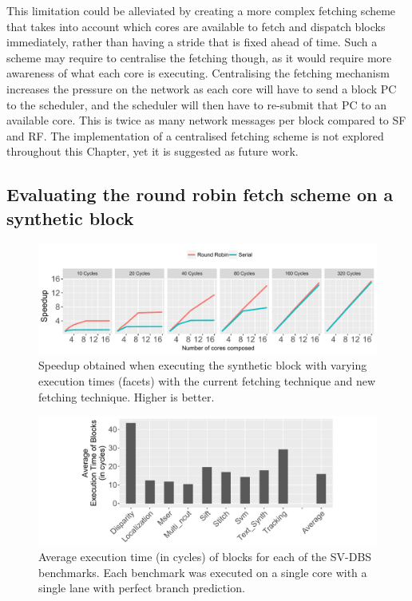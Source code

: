 This limitation could be alleviated by creating a more complex fetching scheme that takes into account which cores are available to fetch and dispatch blocks immediately, rather than having a stride that is fixed ahead of time.
Such a scheme may require to centralise the fetching though, as it would require more awareness of what each core is executing.
Centralising the fetching mechanism increases the pressure on the network as each core will have to send a block PC to the scheduler, and the scheduler will then have to re-submit that PC to an available core.
This is twice as many network messages per block compared to SF and RF.
The implementation of a centralised fetching scheme is not explored throughout this Chapter, yet it is suggested as future work.

\subsection{Evaluating the round robin fetch scheme on a synthetic block}

\begin{figure}[t]
    \centering
    \includegraphics[width=1\textwidth]{chapter3/graphics/motivation_fetch.pdf}
    \caption{Speedup obtained when executing the synthetic block with varying execution times (facets) with the current fetching technique and new fetching technique. Higher is better.}
    \label{fig:motiv_res}
\vspace{1em}
\end{figure}
\begin{figure}[t]
    \centering
    \includegraphics[width=1\textwidth]{chapter3/graphics/sdvbsav.pdf}
    \caption{Average execution time (in cycles) of blocks for each of the SV-DBS benchmarks. Each benchmark was executed on a single core with a single lane with perfect branch prediction.}
    \label{fig:svdbs_av}
\vspace{1em}
\end{figure}


